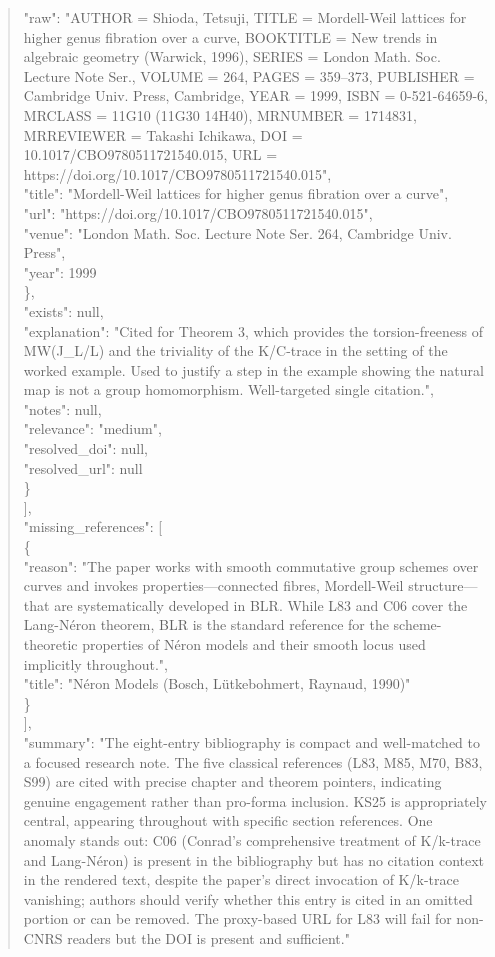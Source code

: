 \documentclass[11pt]{article}
\begin{document}
\begin{quote}
        "raw": "AUTHOR = Shioda, Tetsuji, TITLE = Mordell-Weil lattices for higher genus fibration over a curve, BOOKTITLE = New trends in algebraic geometry (Warwick, 1996), SERIES = London Math. Soc. Lecture Note Ser., VOLUME = 264, PAGES = 359--373, PUBLISHER = Cambridge Univ. Press, Cambridge, YEAR = 1999, ISBN = 0-521-64659-6, MRCLASS = 11G10 (11G30 14H40), MRNUMBER = 1714831, MRREVIEWER = Takashi Ichikawa, DOI = 10.1017/CBO9780511721540.015, URL = https://doi.org/10.1017/CBO9780511721540.015",\\
        "title": "Mordell-Weil lattices for higher genus fibration over a curve",\\
        "url": "https://doi.org/10.1017/CBO9780511721540.015",\\
        "venue": "London Math. Soc. Lecture Note Ser. 264, Cambridge Univ. Press",\\
        "year": 1999\\
      \},\\
      "exists": null,\\
      "explanation": "Cited for Theorem 3, which provides the torsion-freeness of MW(J\_L/L) and the triviality of the K/C-trace in the setting of the worked example. Used to justify a step in the example showing the natural map is not a group homomorphism. Well-targeted single citation.",\\
      "notes": null,\\
      "relevance": "medium",\\
      "resolved\_doi": null,\\
      "resolved\_url": null\\
    \}\\
  ],\\
  "missing\_references": [\\
    \{\\
      "reason": "The paper works with smooth commutative group schemes over curves and invokes properties---connected fibres, Mordell-Weil structure---that are systematically developed in BLR. While L83 and C06 cover the Lang-Néron theorem, BLR is the standard reference for the scheme-theoretic properties of Néron models and their smooth locus used implicitly throughout.",\\
      "title": "Néron Models (Bosch, Lütkebohmert, Raynaud, 1990)"\\
    \}\\
  ],\\
  "summary": "The eight-entry bibliography is compact and well-matched to a focused research note. The five classical references (L83, M85, M70, B83, S99) are cited with precise chapter and theorem pointers, indicating genuine engagement rather than pro-forma inclusion. KS25 is appropriately central, appearing throughout with specific section references. One anomaly stands out: C06 (Conrad's comprehensive treatment of K/k-trace and Lang-Néron) is present in the bibliography but has no citation context in the rendered text, despite the paper's direct invocation of K/k-trace vanishing; authors should verify whether this entry is cited in an omitted portion or can be removed. The proxy-based URL for L83 will fail for non-CNRS readers but the DOI is present and sufficient."\\

\end{quote}
\end{document}
